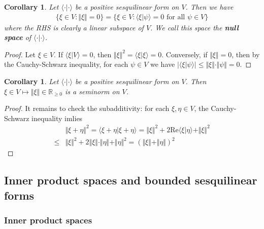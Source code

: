 \documentclass[12pt,b5paper,notitlepage]{article}
\theoremstyle{definition}
\theoremstyle{plain}
\newtheorem{co}[df]{Corollary}
\newcommand{\bk}[1]{\langle {#1}\rangle}
\newcommand{\Rbb}{\mathbb R}
\newcommand{\Real}{\mathrm{Re}}
\numberwithin{equation}{section}
\begin{document}
\begin{co}\label{lb164}
Let $\bk{\cdot|\cdot}$ be a positive sesquilinear form on $V$. Then we have
\begin{align*}
\{\xi\in V:\Vert \xi\Vert=0\}=\{\xi\in V:\bk{\xi|\psi}=0\text{ for all }\psi\in V\}
\end{align*}
where the RHS is clearly a linear subspace of $V$. We call this space the \textbf{null space} of $\bk{\cdot|\cdot}$. 
\end{co}

\begin{proof}
Let $\xi\in V$. If $\bk{\xi|V}=0$, then $\Vert \xi\Vert^2=\bk{\xi|\xi}=0$. Conversely, if $\Vert \xi\Vert=0$, then by the Cauchy-Schwarz inequality, for each $\psi\in V$ we have $|\bk{\xi|\psi}|\leq \Vert \xi\Vert\cdot\Vert\psi\Vert=0$.
\end{proof}





\begin{co}\label{lb115}
Let $\bk{\cdot|\cdot}$ be a positive sesquilinear form on $V$. Then $\xi\in V\mapsto\Vert \xi\Vert\in\Rbb_{\geq0}$ is a seminorm on $V$. 
\end{co}

\begin{proof}
It remains to check the subadditivity: for each $\xi,\eta\in V$, the Cauchy-Schwarz inequality imlies
\begin{align*}
&\Vert \xi+\eta\Vert^2=\bk{\xi+\eta|\xi+\eta}=\Vert \xi\Vert^2+2\Real\bk{\xi|\eta}+\Vert \xi\Vert^2\\
\leq& \Vert \xi\Vert^2+2\Vert \xi\Vert\cdot\Vert \eta\Vert+\Vert \eta\Vert^2=(\Vert \xi\Vert+\Vert \eta\Vert)^2
\end{align*}
\end{proof}






\subsection{Inner product spaces and bounded sesquilinear forms}




\subsubsection{Inner product spaces}
\end{document}
